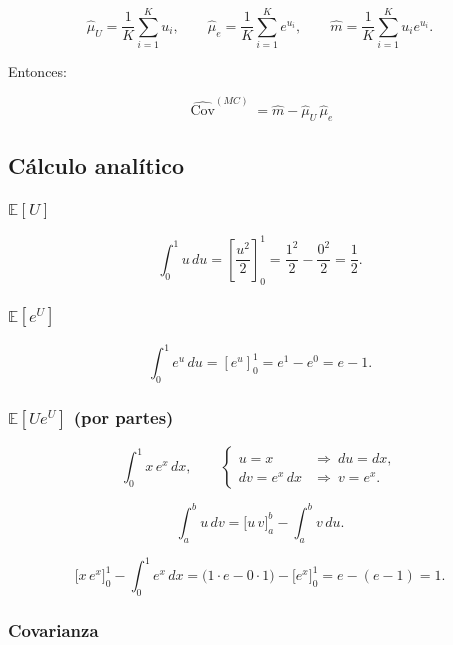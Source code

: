\documentclass[10pt,a4paper]{article} %
\begin{document}
\[
\widehat{\mu}_U=\frac{1}{K}\sum_{i=1}^{K} u_i,\qquad
\widehat{\mu}_{e}=\frac{1}{K}\sum_{i=1}^{K} e^{u_i},\qquad
\widehat{m}=\frac{1}{K}\sum_{i=1}^{K} u_i e^{u_i}.
\]

Entonces:

\[
\;\widehat{\operatorname{Cov}}^{(MC)}=\widehat{m}-\widehat{\mu}_U\,\widehat{\mu}_{e}\;
\]

    \hypertarget{cuxe1lculo-analuxedtico}{%
\subsection{Cálculo analítico}\label{cuxe1lculo-analuxedtico}}

\hypertarget{mathbbeu}{%
\subsubsection{\texorpdfstring{\(\mathbb{E}[U]\)}{\textbackslash mathbb\{E\}{[}U{]}}}\label{mathbbeu}}

\[
\int_{0}^{1}u\,du=\left[\frac{u^{2}}{2}\right]_{0}^{1}
=\frac{1^{2}}{2}-\frac{0^{2}}{2}=\frac12.
\]

\hypertarget{mathbbeeu}{%
\subsubsection{\texorpdfstring{\(\mathbb{E}[e^{U}]\)}{\textbackslash mathbb\{E\}{[}e\^{}\{U\}{]}}}\label{mathbbeeu}}

\[
\int_{0}^{1}e^{u}\,du=\left[e^{u}\right]_{0}^{1}
=e^{1}-e^{0}=e-1.
\]

\hypertarget{mathbbeueu-por-partes}{%
\subsubsection{\texorpdfstring{\(\mathbb{E}[Ue^{U}]\) (por
partes)}{\textbackslash mathbb\{E\}{[}Ue\^{}\{U\}{]} (por partes)}}\label{mathbbeueu-por-partes}}

\[
\int_{0}^{1} x\,e^{x}\,dx,\qquad
\begin{cases}
u=x &\Rightarrow\ du=dx,\\[2pt]
dv=e^{x}\,dx &\Rightarrow\ v=e^{x}.
\end{cases}
\]

\[
\int_a^b u\,dv=\Big[u\,v\Big]_a^b-\int_a^b v\,du.
\]

\[
\Big[x\,e^{x}\Big]_{0}^{1}-\int_{0}^{1} e^{x}\,dx
=\big(1\cdot e-0\cdot 1\big)-\Big[e^{x}\Big]_{0}^{1}
=e-(e-1)=1.
\]

\hypertarget{covarianza}{%
\subsubsection{Covarianza}\label{covarianza}}
\end{document}
